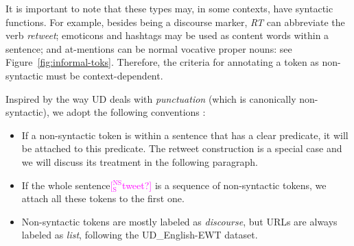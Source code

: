 \documentclass[11pt,a4paper]{article}
\newcommand{\nss}[1]{\textcolor{magenta}{[$_\mathrm{S}^\mathrm{NS}$#1]}}
\begin{document}
It is important to note that these types may, in some
contexts, have syntactic functions.
For example, besides being a discourse marker, \emph{RT} can
abbreviate the verb {\it retweet}; emoticons and hashtags may be
used as content words within a sentence; and at-mentions can be normal vocative proper nouns: see Figure~\ref{fig:informal-toks}.  
Therefore, the criteria for annotating a
token as non-syntactic must be context-dependent.


Inspired by the way UD deals with \emph{punctuation} (which is
canonically non-syntactic), we adopt the following
conventions%
:

\begin{itemize}
\item If a non-syntactic token is within a sentence that has a clear predicate, it will be attached to this predicate. 
The retweet construction is a special case and we will discuss its treatment in the following paragraph.
\item If the whole sentence\nss{tweet?} is a sequence of non-syntactic tokens, we attach all these tokens to the first one.
\item Non-syntactic tokens are mostly labeled as {\it discourse}, but
  URLs are always labeled as {\it list}, following the UD\_English-EWT dataset.%
\end{itemize}
\end{document}
